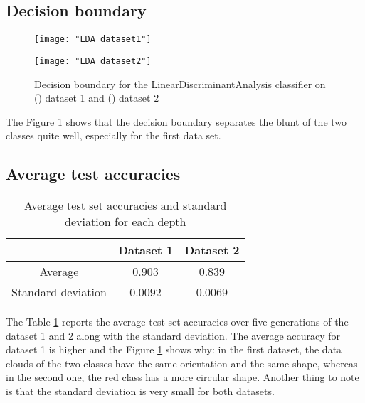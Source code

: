 \documentclass[12pt]{article}
\begin{document}
\subsection{Decision boundary}

\begin{figure}[htbp]
\centering
\begin{minipage}{0.5\linewidth}%
  \centering
  \texttt{[image: "LDA dataset1"]}%
\label{fig:LDA1}%
\end{minipage}%
\begin{minipage}{0.5\linewidth}%
  \centering
  \texttt{[image: "LDA dataset2"]}%
\label{fig:LDA2}%
\end{minipage}%

\caption{ \label{fig:LDA} Decision boundary for the LinearDiscriminantAnalysis classifier on () dataset 1 and () dataset 2}
\end{figure}

The Figure \ref{fig:LDA} shows that the decision boundary separates the blunt of the two classes quite well, especially for the first data set. 

\subsection{Average test accuracies}
\begin{table}[H]
    \centering
    \begin{tabular}{|c|c|c|}
  \hline
 & Dataset 1 & Dataset 2 \\
  \hline
  Average &  0.903  & 0.839 \\
  \hline
  Standard deviation & 0.0092 & 0.0069 \\
  \hline
\end{tabular}
    \caption{Average test set accuracies and standard deviation for each depth}
    \label{tab:mean_lda}
\end{table}

The Table \ref{tab:mean_lda} reports the average test set accuracies over five generations of the dataset 1 and 2 along with the standard deviation.
The average accuracy for dataset 1 is higher and the Figure \ref{fig:LDA} shows why: in the first dataset, the data clouds of the two classes have the same orientation and the same shape, whereas in the second one, the red class has a more circular shape.
Another thing to note is that the standard deviation is very small for both datasets.
\end{document}
